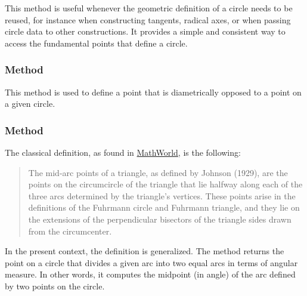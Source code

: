 This method is useful whenever the geometric definition of a circle needs to be reused, for instance when constructing tangents, radical axes, or when passing circle data to other constructions.
It provides a simple and consistent way to access the fundamental points that define a circle.



\subsubsection{Method }
\label{ssub:method_circle_antipode}
This method is used to define a point that is diametrically opposed to a point on a given circle.

\vspace{1em}
\begin{tkzexample}[latex=.5\textwidth]
\begin{center}
\end{center}
\end{tkzexample}

\subsubsection{Method }
\label{ssub:method_circle_midarc}

The classical definition, as found in \href{https://mathworld.wolfram.com/Mid-ArcPoints.html}{MathWorld}, is the following:

\medskip
\begin{quote}
The mid-arc points of a triangle, as defined by Johnson (1929), are the points on the circumcircle of the triangle that lie halfway along each of the three arcs determined by the triangle's vertices. These points arise in the definitions of the Fuhrmann circle and Fuhrmann triangle, and they lie on the extensions of the perpendicular bisectors of the triangle sides drawn from the circumcenter.
\end{quote}

\medskip

In the present context, the definition is generalized. The method returns the point on a circle that divides a given arc into two equal arcs in terms of angular measure. In other words, it computes the midpoint (in angle) of the arc defined by two points on the circle.


